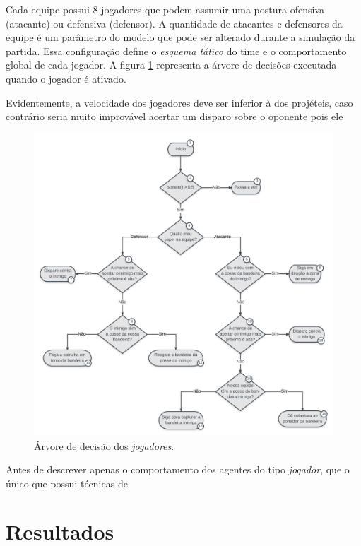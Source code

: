 \documentclass[preprint,12pt]{elsarticle}
\begin{document}
Cada equipe possui 8 jogadores que podem assumir uma postura ofensiva (atacante) ou defensiva (defensor). A quantidade de atacantes e defensores da equipe é um parâmetro do modelo que pode ser alterado durante a simulação da partida. Essa configuração define o \textit{esquema tático} do time e o comportamento global de cada jogador. A figura \ref{fig:flag-decision-tree} representa a árvore de decisões executada quando o jogador  é ativado.

Evidentemente, a velocidade dos jogadores deve ser inferior à dos projéteis, caso contrário seria muito improvável acertar um disparo sobre o oponente pois ele

\begin{figure}[H]
	\centering
	\includegraphics[totalheight=15cm]{figures/flag-tree.png}
	\caption{Árvore de decisão dos \textit{jogadores}.}
	\label{fig:flag-decision-tree}
\end{figure}



Antes de descrever apenas o comportamento dos agentes do tipo \textit{jogador}, que o único que possui técnicas de 

\section{Resultados}
\label{sec:resultados}
\end{document}
